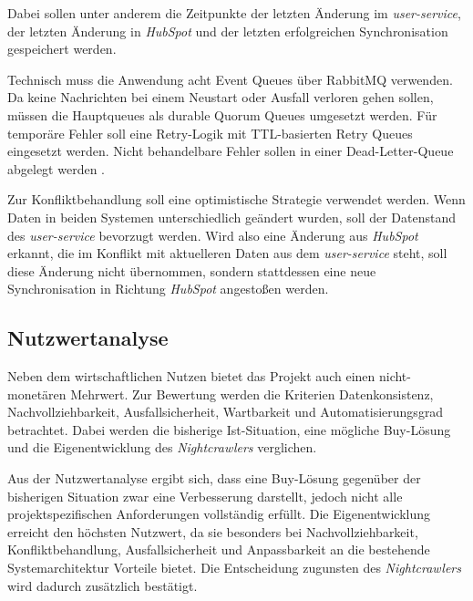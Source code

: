 Dabei sollen unter anderem die Zeitpunkte der letzten Änderung im \textit{user-service}, der letzten Änderung in \textit{HubSpot}
und der letzten erfolgreichen Synchronisation gespeichert werden.
\par\smallskip
Technisch muss die Anwendung acht Event Queues über RabbitMQ verwenden.
Da keine Nachrichten bei einem Neustart oder Ausfall verloren gehen sollen, müssen die Hauptqueues als durable Quorum Queues umgesetzt werden.
Für temporäre Fehler soll eine Retry-Logik mit TTL-basierten Retry Queues eingesetzt werden.
Nicht behandelbare Fehler sollen in einer Dead-Letter-Queue abgelegt werden \cite{RabbitMQDocs}.
\par\smallskip
Zur Konfliktbehandlung soll eine optimistische Strategie verwendet werden.
Wenn Daten in beiden Systemen unterschiedlich geändert wurden, soll der Datenstand des \textit{user-service} bevorzugt werden.
Wird also eine Änderung aus \textit{HubSpot} erkannt, die im Konflikt mit aktuelleren Daten aus dem \textit{user-service} steht,
soll diese Änderung nicht übernommen, sondern stattdessen eine neue Synchronisation in Richtung \textit{HubSpot} angestoßen werden.

\subsection{Nutzwertanalyse}
\label{sec:Nutzwertanalyse}
Neben dem wirtschaftlichen Nutzen bietet das Projekt auch einen nicht-monetären Mehrwert.
Zur Bewertung werden die Kriterien Datenkonsistenz, Nachvollziehbarkeit, Ausfallsicherheit, Wartbarkeit und Automatisierungsgrad betrachtet.
Dabei werden die bisherige Ist-Situation, eine mögliche Buy-Lösung und die Eigenentwicklung des \textit{Nightcrawlers} verglichen.


Aus der Nutzwertanalyse ergibt sich, dass eine Buy-Lösung gegenüber der bisherigen Situation zwar eine Verbesserung darstellt,
jedoch nicht alle projektspezifischen Anforderungen vollständig erfüllt.
Die Eigenentwicklung erreicht den höchsten Nutzwert, da sie besonders bei Nachvollziehbarkeit, Konfliktbehandlung,
Ausfallsicherheit und Anpassbarkeit an die bestehende Systemarchitektur Vorteile bietet.
Die Entscheidung zugunsten des \textit{Nightcrawlers} wird dadurch zusätzlich bestätigt.